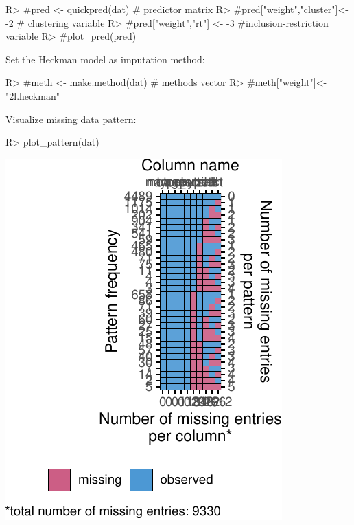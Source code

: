 \documentclass[
]{jss}
\begin{document}
\begin{CodeChunk}
\begin{CodeInput}
R> #pred <- quickpred(dat)   # predictor matrix
R> #pred["weight","cluster"]<- -2 # clustering variable
R> #pred["weight","rt"] <- -3 #inclusion-restriction variable
R> #plot_pred(pred)
\end{CodeInput}
\end{CodeChunk}

Set the Heckman model as imputation method:

\begin{CodeChunk}
\begin{CodeInput}
R> #meth <- make.method(dat) # methods vector
R> #meth["weight"]<-"2l.heckman"
\end{CodeInput}
\end{CodeChunk}

Visualize missing data pattern:

\begin{CodeChunk}
\begin{CodeInput}
R> plot_pattern(dat)
\end{CodeInput}


\begin{center}\includegraphics{Imputation_of_Incomplete_Multilevel_Data_files/figure-latex/obesity-md-1} \end{center}

\end{CodeChunk}
\end{document}

